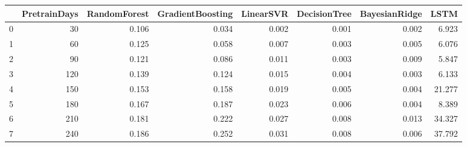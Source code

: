 \begin{tabular}{lrrrrrrr}
\toprule
{} &  PretrainDays &  RandomForest &  GradientBoosting &  LinearSVR &  DecisionTree &  BayesianRidge &   LSTM \\
\midrule
0 &            30 &         0.106 &             0.034 &      0.002 &         0.001 &          0.002 &  6.923 \\
1 &            60 &         0.125 &             0.058 &      0.007 &         0.003 &          0.005 &  6.076 \\
2 &            90 &         0.121 &             0.086 &      0.011 &         0.003 &          0.009 &  5.847 \\
3 &           120 &         0.139 &             0.124 &      0.015 &         0.004 &          0.003 &  6.133 \\
4 &           150 &         0.153 &             0.158 &      0.019 &         0.005 &          0.004 & 21.277 \\
5 &           180 &         0.167 &             0.187 &      0.023 &         0.006 &          0.004 &  8.389 \\
6 &           210 &         0.181 &             0.222 &      0.027 &         0.008 &          0.013 & 34.327 \\
7 &           240 &         0.186 &             0.252 &      0.031 &         0.008 &          0.006 & 37.792 \\
\bottomrule
\end{tabular}

